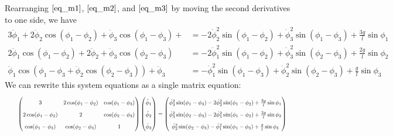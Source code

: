 \documentclass{article}
\begin{document}
\begin{appendices}
    Rearranging $\eqref{eq_m1}$, $\eqref{eq_m2}$, and $\eqref{eq_m3}$ by moving
    the second derivatives to one side, we have
    \begin{align}
         3\ddot\phi_1 + 2\ddot\phi_2\cos(\phi_1-\phi_2) + \ddot\phi_3\cos(\phi_1-\phi_3) + 
             &= -2\dot\phi_2^2\sin(\phi_1-\phi_2) + \dot\phi_3^2\sin(\phi_1-\phi_3)
             +\frac{3g}{l}\sin\phi_1 \\
        2\ddot\phi_1\cos(\phi_1-\phi_2)+ 2\ddot\phi_2 + \ddot\phi_3\cos(\phi_2-\phi_3)
            &= - 2\dot\phi_1^2\sin(\phi_1-\phi_2) + \dot\phi_3^2\sin(\phi_2-\phi_3)
            +\frac{2g}{l}\sin\phi_2 \\
        \ddot\phi_1\cos(\phi_1-\phi_3+ \ddot\phi_2\cos(\phi_2-\phi_3)) + \ddot\phi_3
            &= - \dot\phi_1^2\sin(\phi_1-\phi_3) + \dot\phi_2^2\sin(\phi_2-\phi_3)
            +\frac{g}{l}\sin\phi_3
    \end{align}
    We can rewrite this system  equations as a single matrix equation:
    \begingroup 
    \begin{equation} 
        \renewcommand*{\arraystretch}{1.75} %
        \resizebox{0.95\textwidth}{!}{$
        \begin{pmatrix}
            3                    & 2\cos(\phi_1-\phi_2) & \cos(\phi_1-\phi_3) \\
            2\cos(\phi_1-\phi_2) & 2                    & \cos(\phi_2-\phi_3) \\
            \cos(\phi_1-\phi_3)  & \cos(\phi_2-\phi_3)  & 1                   \\
        \end{pmatrix}
        \begin{pmatrix}
            \ddot\phi_1 \\
            \ddot\phi_2 \\
            \ddot\phi_3
        \end{pmatrix} =
        \begin{pmatrix}
            \dot\phi_3^2\sin(\phi_1-\phi_3) -2\dot\phi_2^2\sin(\phi_1-\phi_2)
                +\frac{3g}{l}\sin\phi_1 \\
            \dot\phi_3^2\sin(\phi_2-\phi_3) - 2\dot\phi_1^2\sin(\phi_1-\phi_2)
                +\frac{2g}{l}\sin\phi_2 \\
            \dot\phi_2^2\sin(\phi_2-\phi_3) -\dot\phi_1^2\sin(\phi_1-\phi_3)
                +\frac{g}{l}\sin\phi_3
        \end{pmatrix}
        $}
    \end{equation} 

\end{appendices}
\end{document}
